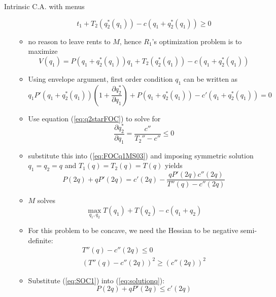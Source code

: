 \documentclass[11pt,english]{beamer}
\newcommand{\dif}{\partial}
\begin{document}
\begin{frame}[allowframebreaks]{Intrinsic C.A. with menus}
\begin{enumerate}
\begin{itemize}
        \begin{equation*}
          t_1 +T_2(q^*_2(q_1))-c(q_1+q_2^*(q_1)) \geq 0
        \end{equation*}
      \item no reason to leave rents to $M$, hence $R_1$'s
        optimization problem is to maximize
        \begin{equation*}
          V(q_1) = P(q_1+q_2^*(q_1))q_1 +T_2(q^*_2(q_1))-c(q_1+q_2^*(q_1))
        \end{equation*}
      \item Using envelope argument, first order condition $q_1$ can
        be written as
        \begin{equation}
          \label{eq:FOCq1MS03}
          q_1P'(q_1+q_2^*(q_1)) \left(1+\frac{\dif q_2^*}{\dif q_1}
          \right) + P(q_1+q_2^*(q_1))-c'(q_1+q_2^*(q_1)) =0
        \end{equation}
      \item Use equation (\ref{eq:q2starFOC}) to solve for
        \begin{equation}
          \label{eq:dq2dq1MS03}
          \frac{\dif q_2^*}{\dif q_1} = \frac{c''}{T_2''-c''} \leq 0
        \end{equation}
      \item substitute this into (\ref{eq:FOCq1MS03}) and imposing
        symmetric solution $q_1=q_2=q$ and $T_1(q)=T_2(q)=T(q)$ yields
        \begin{equation}
          \label{eq:solutionq}
          P(2q) + qP'(2q) = c'(2q) - \frac{q P'(2q)c''(2q)}{T''(q)-c''(2q)}
        \end{equation}
      \item $M$ solves
        \begin{equation}
          \label{eq:OptimizationProblemM}
          \max_{q_1,q_2} T(q_1)+T(q_2)-c(q_1+q_2)
        \end{equation}
      \item For this problem to be concave, we need the Hessian to be
        negative semi-definite:
        \begin{gather}
          \label{eq:SOC1} T''(q)-c''(2q) \leq 0 \\
          \label{eq:SOC2} (T''(q)-c''(2q))^2 \geq (c''(2q))^2
        \end{gather}
      \item Substitute (\ref{eq:SOC1}) into (\ref{eq:solutionq}):
        \begin{equation*}
          P(2q)+qP'(2q) \leq c'(2q)

\end{equation*}
\end{itemize}
\end{enumerate}
\end{frame}
\end{document}
